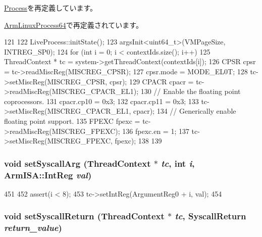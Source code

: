 \hyperlink{classProcess_a3c34ea9b29f410748d4435a667484924}{Process}を再定義しています。

\hyperlink{classArmLinuxProcess64_a3c34ea9b29f410748d4435a667484924}{ArmLinuxProcess64}で再定義されています。


\begin{DoxyCode}
121 {
122     LiveProcess::initState();
123     argsInit<uint64_t>(VMPageSize, INTREG_SP0);
124     for (int i = 0; i < contextIds.size(); i++) {
125         ThreadContext * tc = system->getThreadContext(contextIds[i]);
126         CPSR cpsr = tc->readMiscReg(MISCREG_CPSR);
127         cpsr.mode = MODE_EL0T;
128         tc->setMiscReg(MISCREG_CPSR, cpsr);
129         CPACR cpacr = tc->readMiscReg(MISCREG_CPACR_EL1);
130         // Enable the floating point coprocessors.
131         cpacr.cp10 = 0x3;
132         cpacr.cp11 = 0x3;
133         tc->setMiscReg(MISCREG_CPACR_EL1, cpacr);
134         // Generically enable floating point support.
135         FPEXC fpexc = tc->readMiscReg(MISCREG_FPEXC);
136         fpexc.en = 1;
137         tc->setMiscReg(MISCREG_FPEXC, fpexc);
138     }
139 }
\end{DoxyCode}
\hypertarget{classArmLiveProcess64_addce5483f248b617812cb55b7e58ffd0}{
\subsubsection[{setSyscallArg}]{\setlength{\rightskip}{0pt plus 5cm}void setSyscallArg ({\bf ThreadContext} $\ast$ {\em tc}, \/  int {\em i}, \/  {\bf ArmISA::IntReg} {\em val})}}
\label{classArmLiveProcess64_addce5483f248b617812cb55b7e58ffd0}



\begin{DoxyCode}
451 {
452     assert(i < 8);
453     tc->setIntReg(ArgumentReg0 + i, val);
454 }
\end{DoxyCode}
\hypertarget{classArmLiveProcess64_aaefd02663c1eae206b851290d9276a5e}{
\subsubsection[{setSyscallReturn}]{\setlength{\rightskip}{0pt plus 5cm}void setSyscallReturn ({\bf ThreadContext} $\ast$ {\em tc}, \/  {\bf SyscallReturn} {\em return\_\-value})}}
\label{classArmLiveProcess64_aaefd02663c1eae206b851290d9276a5e}


